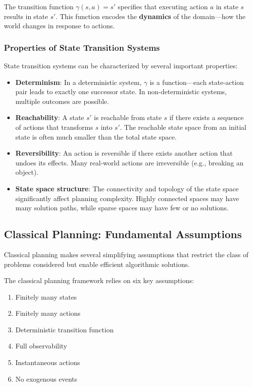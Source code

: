 \documentclass[11pt,a4paper]{article}
\theoremstyle{definition}
\theoremstyle{plain}
\theoremstyle{remark}
\begin{document}
The transition function $\gamma(s, a) = s'$ specifies that executing action $a$ in state $s$ results in state $s'$. This function encodes the \textbf{dynamics} of the domain—how the world changes in response to actions.

\subsubsection{Properties of State Transition Systems}

State transition systems can be characterized by several important properties:

\begin{itemize}
    \item \textbf{Determinism}: In a deterministic system, $\gamma$ is a function—each state-action pair leads to exactly one successor state. In non-deterministic systems, multiple outcomes are possible.
    
    \item \textbf{Reachability}: A state $s'$ is reachable from state $s$ if there exists a sequence of actions that transforms $s$ into $s'$. The reachable state space from an initial state is often much smaller than the total state space.
    
    \item \textbf{Reversibility}: An action is reversible if there exists another action that undoes its effects. Many real-world actions are irreversible (e.g., breaking an object).
    
    \item \textbf{State space structure}: The connectivity and topology of the state space significantly affect planning complexity. Highly connected spaces may have many solution paths, while sparse spaces may have few or no solutions.
\end{itemize}

\subsection{Classical Planning: Fundamental Assumptions}

Classical planning makes several simplifying assumptions that restrict the class of problems considered but enable efficient algorithmic solutions.

\begin{tcolorbox}[colback=blue!5!white,colframe=blue!75!black,title=\textbf{Classical Planning Framework}]
The classical planning framework relies on six key assumptions:
\begin{enumerate}
    \item Finitely many states
    \item Finitely many actions
    \item Deterministic transition function
    \item Full observability
    \item Instantaneous actions
    \item No exogenous events
\end{enumerate}
\end{tcolorbox}
\end{document}
